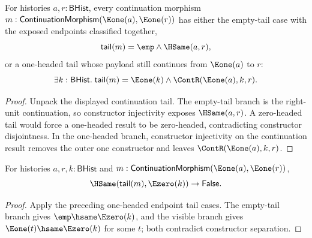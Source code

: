 \begin{theorem}
\label{thm:continuation-morphism-e1-source-e1-target-tail-cases}
For histories $a,r:\mathsf{BHist}$, every continuation morphism
$m:\mathsf{ContinuationMorphism}(\Eone(a),\Eone(r))$ has either the empty-tail
case with the exposed endpoints classified together,
$$
\mathsf{tail}(m)=\emp\land\HSame(a,r),
$$
or a one-headed tail whose payload still continues from $\Eone(a)$ to $r$:
$$
\exists k:\mathsf{BHist}.\;
\mathsf{tail}(m)=\Eone(k)\land \ContR(\Eone(a),k,r).
$$
\end{theorem}
\begin{proof}
Unpack the displayed continuation tail. The empty-tail branch is the right-unit
continuation, so constructor injectivity exposes $\HSame(a,r)$. A zero-headed
tail would force a one-headed result to be zero-headed, contradicting
constructor disjointness. In the one-headed branch, constructor injectivity on
the continuation result removes the outer one constructor and leaves
$\ContR(\Eone(a),k,r)$.
\end{proof}

\begin{theorem}
\label{thm:continuation-morphism-e1-source-e1-target-tail-e0-absurd}
For histories $a,r,k:\mathsf{BHist}$ and
$m:\mathsf{ContinuationMorphism}(\Eone(a),\Eone(r))$,
$$
\HSame(\mathsf{tail}(m),\Ezero(k))\to\mathsf{False}.
$$
\end{theorem}
\begin{proof}
Apply the preceding one-headed endpoint tail cases. The empty-tail branch gives
$\emp\hsame\Ezero(k)$, and the visible branch gives
$\Eone(t)\hsame\Ezero(k)$ for some $t$; both contradict constructor separation.
\end{proof}

